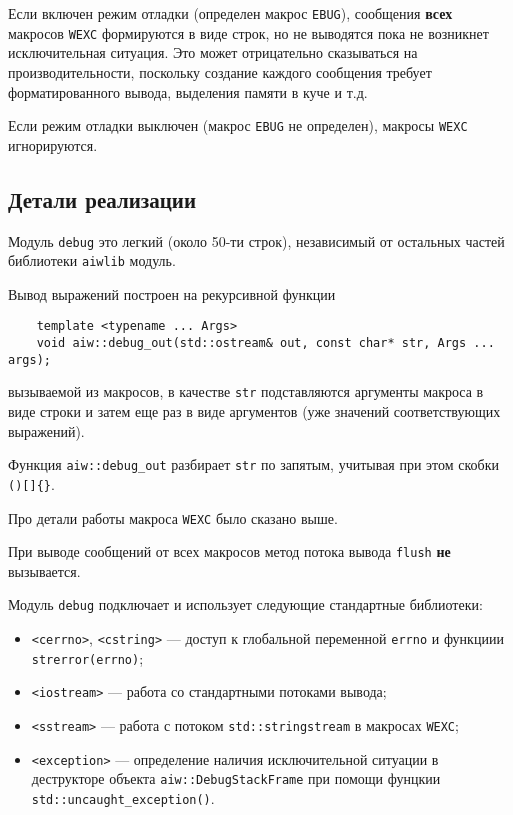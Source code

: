 Если включен режим отладки (определен макрос \verb'EBUG'), сообщения {\bf всех} макросов \verb'WEXC' формируются в виде строк,
но не выводятся пока не возникнет исключительная ситуация.
Это может отрицательно сказываться на производительности, поскольку создание каждого сообщения
требует форматированного вывода, выделения памяти в куче и т.д.

Если режим отладки выключен (макрос \verb'EBUG' не определен), макросы \verb'WEXC' игнорируются.


\subsection{Детали реализации}
Модуль \verb'debug' это легкий (около 50-ти строк), независимый от остальных частей библиотеки \verb'aiwlib' модуль.

Вывод выражений построен на рекурсивной функции
\begin{verbatim}
    template <typename ... Args> 
    void aiw::debug_out(std::ostream& out, const char* str, Args ... args);
\end{verbatim}
вызываемой из макросов, в качестве \verb'str' подставляются аргументы макроса в виде строки и затем еще раз
в виде аргументов (уже значений соответствующих выражений). 

Функция \verb'aiw::debug_out' разбирает \verb'str' по запятым, учитывая при этом скобки \verb'()[]{}'.

Про детали работы макроса \verb'WEXC' было сказано выше.

При выводе сообщений от всех макросов метод потока вывода \verb'flush' {\bf не} вызывается. 

Модуль \verb'debug' подключает и использует следующие стандартные библиотеки:
\begin{itemize}
\item \verb'<cerrno>', \verb'<cstring>' --- доступ к глобальной переменной \verb'errno' и функциии \verb'strerror(errno)';  
\item \verb'<iostream>' --- работа со стандартными потоками вывода;
\item \verb'<sstream>' --- работа с потоком \verb'std::stringstream' в макросах \verb'WEXC';
\item \verb'<exception>' --- определение наличия исключительной ситуации в деструкторе объекта \verb'aiw::DebugStackFrame'
  при помощи фунцкии \verb'std::uncaught_exception()'.
\end{itemize}


 
